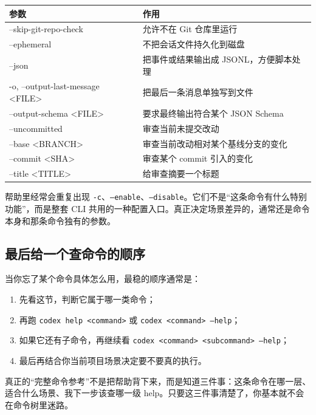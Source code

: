 \documentclass[UTF8,a4paper,12pt]{ctexart}
\begin{document}
\begin{longtable}{>{\ttfamily\raggedright\arraybackslash}p{} >{\raggedright\arraybackslash}p{}}
\toprule
参数 & 作用 \\
\midrule
\endhead
--skip-git-repo-check & 允许不在 Git 仓库里运行 \\
--ephemeral & 不把会话文件持久化到磁盘 \\
--json & 把事件或结果输出成 JSONL，方便脚本处理 \\
-o, --output-last-message <FILE> & 把最后一条消息单独写到文件 \\
--output-schema <FILE> & 要求最终输出符合某个 JSON Schema \\
--uncommitted & 审查当前未提交改动 \\
--base <BRANCH> & 审查当前改动相对某个基线分支的变化 \\
--commit <SHA> & 审查某个 commit 引入的变化 \\
--title <TITLE> & 给审查摘要一个标题 \\
\bottomrule
\end{longtable}

\begin{warnbox}
帮助里经常会重复出现 \texttt{-c}、\texttt{--enable}、\texttt{--disable}。它们不是“这条命令有什么特别功能”，而是整套 CLI 共用的一种配置入口。真正决定场景差异的，通常还是命令本身和那条命令独有的参数。
\end{warnbox}

\subsection{最后给一个查命令的顺序}

当你忘了某个命令具体怎么用，最稳的顺序通常是：
\begin{enumerate}
  \item 先看这节，判断它属于哪一类命令；
  \item 再跑 \texttt{codex help <command>} 或 \texttt{codex <command> --help}；
  \item 如果它还有子命令，再继续看 \texttt{codex <command> <subcommand> --help}；
  \item 最后再结合你当前项目场景决定要不要真的执行。
\end{enumerate}

\begin{sumbox}
真正的“完整命令参考”不是把帮助背下来，而是知道三件事：这条命令在哪一层、适合什么场景、我下一步该查哪一级 help。只要这三件事清楚了，你基本就不会在命令树里迷路。
\end{sumbox}
\end{document}
